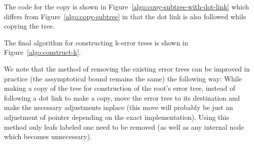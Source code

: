 \documentclass[a4paper,10pt]{article}
\begin{document}


The code for the copy is shown in Figure~\ref{algo:copy-subtree-with-dot-link} which differs from Figure~\ref{algo:copy-subtree} in that the dot link is also followed while copying the tree.



The final algorithm for constructing k-error trees is shown in Figure~\ref{algo:construct-k}.

We note that the method of removing the existing error trees can be improved in practice (the assymptotical bound remains the same) the following way: While making a copy of the tree for construction of the root's error tree, instead of following a dot link to make a copy, move the error tree to its destination and make the necessary adjustments inplace (this move will probably be just an adjustment of pointer depending on the exact implementation). Using this method only leafs labeled one need to be removed (as well as any internal node which becomes unnecessary).



\end{document}
